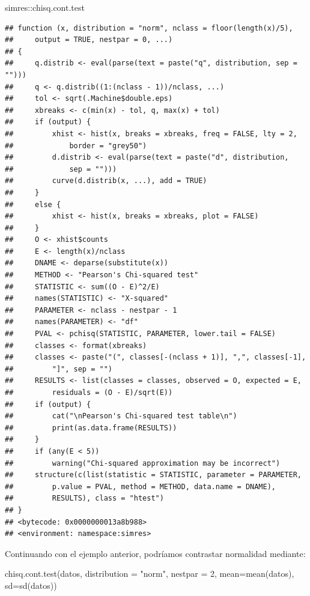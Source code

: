 \documentclass[
]{book}
\newenvironment{Shaded}{\begin{snugshade}}{\end{snugshade}}
\newcommand{\AttributeTok}[1]{\textcolor[rgb]{0.77,0.63,0.00}{#1}}
\newcommand{\DecValTok}[1]{\textcolor[rgb]{0.00,0.00,0.81}{#1}}
\newcommand{\FunctionTok}[1]{\textcolor[rgb]{0.00,0.00,0.00}{#1}}
\newcommand{\NormalTok}[1]{#1}
\newcommand{\SpecialCharTok}[1]{\textcolor[rgb]{0.00,0.00,0.00}{#1}}
\newcommand{\StringTok}[1]{\textcolor[rgb]{0.31,0.60,0.02}{#1}}
\theoremstyle{break}
\theoremstyle{nonumberplain}
\begin{document}
\begin{Shaded}
\begin{Highlighting}[]
\NormalTok{simres}\SpecialCharTok{::}\NormalTok{chisq.cont.test}
\end{Highlighting}
\end{Shaded}

\begin{verbatim}
## function (x, distribution = "norm", nclass = floor(length(x)/5), 
##     output = TRUE, nestpar = 0, ...) 
## {
##     q.distrib <- eval(parse(text = paste("q", distribution, sep = "")))
##     q <- q.distrib((1:(nclass - 1))/nclass, ...)
##     tol <- sqrt(.Machine$double.eps)
##     xbreaks <- c(min(x) - tol, q, max(x) + tol)
##     if (output) {
##         xhist <- hist(x, breaks = xbreaks, freq = FALSE, lty = 2, 
##             border = "grey50")
##         d.distrib <- eval(parse(text = paste("d", distribution, 
##             sep = "")))
##         curve(d.distrib(x, ...), add = TRUE)
##     }
##     else {
##         xhist <- hist(x, breaks = xbreaks, plot = FALSE)
##     }
##     O <- xhist$counts
##     E <- length(x)/nclass
##     DNAME <- deparse(substitute(x))
##     METHOD <- "Pearson's Chi-squared test"
##     STATISTIC <- sum((O - E)^2/E)
##     names(STATISTIC) <- "X-squared"
##     PARAMETER <- nclass - nestpar - 1
##     names(PARAMETER) <- "df"
##     PVAL <- pchisq(STATISTIC, PARAMETER, lower.tail = FALSE)
##     classes <- format(xbreaks)
##     classes <- paste("(", classes[-(nclass + 1)], ",", classes[-1], 
##         "]", sep = "")
##     RESULTS <- list(classes = classes, observed = O, expected = E, 
##         residuals = (O - E)/sqrt(E))
##     if (output) {
##         cat("\nPearson's Chi-squared test table\n")
##         print(as.data.frame(RESULTS))
##     }
##     if (any(E < 5)) 
##         warning("Chi-squared approximation may be incorrect")
##     structure(c(list(statistic = STATISTIC, parameter = PARAMETER, 
##         p.value = PVAL, method = METHOD, data.name = DNAME), 
##         RESULTS), class = "htest")
## }
## <bytecode: 0x0000000013a8b988>
## <environment: namespace:simres>
\end{verbatim}

Continuando con el ejemplo anterior, podríamos contrastar normalidad mediante:

\begin{Shaded}
\begin{Highlighting}[]
\FunctionTok{chisq.cont.test}\NormalTok{(datos, }\AttributeTok{distribution =} \StringTok{"norm"}\NormalTok{, }\AttributeTok{nestpar =} \DecValTok{2}\NormalTok{, }\AttributeTok{mean=}\FunctionTok{mean}\NormalTok{(datos), }\AttributeTok{sd=}\FunctionTok{sd}\NormalTok{(datos))}
\end{Highlighting}
\end{Shaded}
\end{document}
